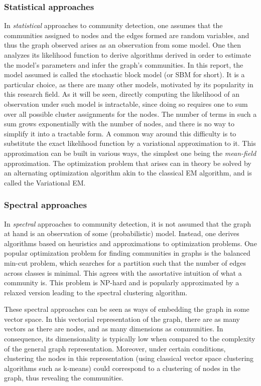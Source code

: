 \documentclass[../../main.tex]{subfiles} %
\begin{document}
\subsubsection{Statistical approaches}
In \textit{statistical} approaches to community detection, one assumes that 
the communities assigned to nodes and the edges formed are random variables, 
and thus the graph observed arises as an observation from some model. One 
then analyzes its likelihood function to derive algorithms derived in order to 
estimate the model's parameters and infer the graph's communities. In this 
report, the model assumed is called the stochastic block model (or SBM for 
short). It is a particular choice, as there are many other models, motivated by its 
popularity in this research field. As it will be seen, directly computing the 
likelihood of an observation under such model is intractable, since doing so 
requires one to sum over all possible cluster assignments for the nodes. The 
number of terms in such a sum grows exponentially with the number of nodes, 
and there is no way to simplify it into a tractable form. A common way around 
this difficulty is to substitute the exact likelihood function by a variational 
approximation to it. This approximation can be built in various ways, the 
simplest one being the \textit{mean-field} approximation. The optimization 
problem that arises can in theory be solved by an alternating optimization 
algorithm akin to the classical EM algorithm, and is called the Variational EM.

\subsubsection{Spectral approaches}
In \textit{spectral} approaches to community 
detection, it is not 
assumed 
that the graph at hand is an observation of some (probabilistic) model. 
Instead, 
one derives algorithms based on heuristics and approximations to 
optimization 
problems. One popular optimization problem for finding communities in 
graphs 
is the balanced min-cut problem, which searches for a partition such that 
the 
number of edges across classes is minimal. This agrees with the assortative 
intuition of what a community is. This problem is NP-hard and is popularly 
approximated by a relaxed version leading to the spectral clustering 
algorithm.

These spectral approaches can be seen as ways of embedding the graph in 
some vector space. In this vectorial representation of the graph, there are 
as 
many vectors as there are nodes, and as many dimensions as communities. 
In 
consequence, its dimensionality is typically low when compared to the 
complexity of the general graph representation. Moreover, under certain 
conditions, clustering the nodes in this representation (using classical 
vector 
space clustering algorithms such as k-means) could correspond to a 
clustering 
of nodes in the graph, thus revealing the communities.
\end{document}
